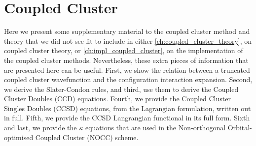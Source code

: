 \chapter{Coupled Cluster}

Here we present some supplementary material to the coupled cluster method and 
theory that we did not see fit to include in either \autoref{ch:coupled_cluster_theory},
on coupled cluster theory, or \autoref{ch:impl_coupled_cluster}, on the implementation 
of the coupled cluster methods. Nevertheless, these extra pieces of information that are 
presented here can be useful. First, we show the relation between a truncated coupled
cluster wavefunction and
the configuration interaction expansion. Second, we derive the Slater-Condon rules, and 
third, use them to derive the Coupled Cluster Doubles (CCD) equations. Fourth, 
we provide the Coupled Cluster Singles Doubles (CCSD) equations, from the 
Lagrangian formulation, written out in full. Fifth, we provide the CCSD Langrangian 
functional in its full form. Sixth and last, we provide the $\kappa$ equations that 
are used in the Non-orthogonal Orbital-optimised Coupled Cluster (NOCC) scheme.












\clearemptydoublepage